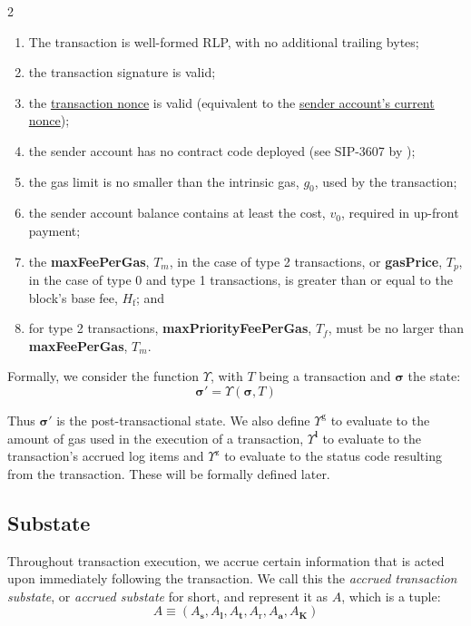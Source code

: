 \documentclass[9pt,oneside]{amsart}
\begin{document}
\begin{multicols}{2}
\begin{enumerate}
\item The transaction is well-formed RLP, with no additional trailing bytes;
\item the transaction signature is valid;
\item the \hyperlink{transaction_nonce}{transaction nonce} is valid (equivalent to the \hyperlink{account_nonce}{sender account's current nonce});
\item the sender account has no contract code deployed (see SIP-3607 by \cite{SIP-3607});
\item the gas limit is no smaller than the intrinsic gas, $g_0$, used by the transaction;
\item the sender account balance contains at least the cost, $v_0$, required in up-front payment;
\item the \textbf{maxFeePerGas}, $T_m$, in the case of type 2 transactions, or \textbf{gasPrice}, $T_p$, in the case of type 0 and type 1 transactions, is greater than or equal to the block's base fee, $H_{\mathrm{f}}$; and
\item for type 2 transactions, \textbf{maxPriorityFeePerGas}, $T_f$, must be no larger than \textbf{maxFeePerGas}, $T_m$.
\end{enumerate}

Formally, we consider the function \hyperlink{Upsilon_state_transition}{$\Upsilon$}, with $T$ being a transaction and $\boldsymbol{\sigma}$ the state:
\begin{equation}
\boldsymbol{\sigma}' = \Upsilon(\boldsymbol{\sigma}, T)
\end{equation}

Thus $\boldsymbol{\sigma}'$ is the post-transactional state. We also define \hyperlink{tx_total_gas_used_Upsilon_pow_g}{$\Upsilon^{\mathrm{g}}$} to evaluate to the amount of gas used in the execution of a transaction, \hyperlink{tx_logs_Upsilon_pow_l}{$\Upsilon^{\mathbf{l}}$} to evaluate to the transaction's accrued log items and \hyperlink{tx_status_Upsilon_pow_z}{$\Upsilon^{\mathrm{z}}$} to evaluate to the status code resulting from the transaction. These will be formally defined later.

\subsection{Substate} \label{ch:substate}
Throughout transaction execution, we accrue certain information that is acted upon immediately following the transaction. We call this the \textit{accrued transaction substate}, or \textit{accrued substate} for short, and represent it as $A$, which is a tuple:
\begin{equation}
A \equiv (A_{\mathbf{s}}, A_{\mathbf{l}}, A_{\mathbf{t}}, A_{\mathrm{r}}, A_{\mathbf{a}}, A_{\mathbf{K}})
\end{equation}


\end{multicols}
\end{document}
